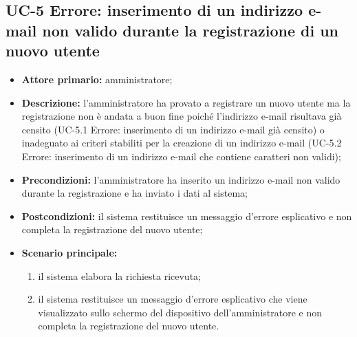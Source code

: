 \subsection{UC-5 Errore: inserimento di un indirizzo e-mail non valido durante la registrazione di un nuovo utente}
\begin{itemize}
	\item \textbf{Attore primario:} amministratore;

	\item \textbf{Descrizione:} l'amministratore ha provato a registrare un nuovo utente ma la registrazione non è andata a buon fine poiché l'indirizzo e-mail risultava già censito (UC-5.1 Errore: inserimento di un indirizzo e-mail già censito) o inadeguato ai criteri stabiliti per la creazione di un indirizzo e-mail (UC-5.2 Errore: inserimento di un indirizzo e-mail che contiene caratteri non validi);

	\item \textbf{Precondizioni:} l'amministratore ha inserito un indirizzo e-mail non valido durante la registrazione e ha inviato i dati al sistema;

	\item \textbf{Postcondizioni:} il sistema restituisce un messaggio d'errore esplicativo e non completa la registrazione del nuovo utente;

	\item \textbf{Scenario principale:}
	      \begin{enumerate}
		      \item il sistema elabora la richiesta ricevuta;
		      \item il sistema restituisce un messaggio d'errore esplicativo che viene visualizzato sullo schermo del dispositivo dell'amministratore e non completa la registrazione del nuovo utente.
	      \end{enumerate}
\end{itemize}

